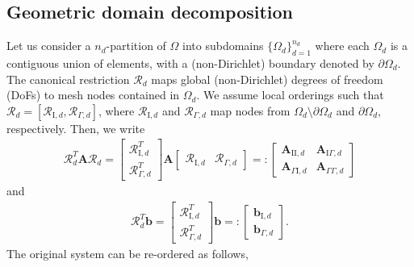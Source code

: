 \documentclass{article}
\begin{document}
\subsection{Geometric domain decomposition}
Let us consider a $n_d$-partition of $\Omega$ into subdomains $\{\Omega_d\}_{d=1}^{n_d}$ where each $\Omega_d$ is a contiguous union of elements, with a (non-Dirichlet) boundary denoted by $\partial\Omega_d$.
The canonical restriction $\boldsymbol{\mathcal{R}}_d$ maps global (non-Dirichlet) degrees of freedom (DoFs) to mesh nodes contained in $\Omega_d$.
We assume local orderings such that $\boldsymbol{\mathcal{R}}_d=[\boldsymbol{\mathcal{R}}_{\mathrm{I},d},\boldsymbol{\mathcal{R}}_{\Gamma,d}]$,
where $\boldsymbol{\mathcal{R}}_{\mathrm{I},d}$ and $\boldsymbol{\mathcal{R}}_{\Gamma,d}$ map nodes from $\Omega_d\setminus\partial\Omega_d$ and $\partial\Omega_d$, respectively.
Then, we write
\begin{align}
\boldsymbol{\mathcal{R}}_d^T\mathbf{A}\boldsymbol{\mathcal{R}}_d=
\begin{bmatrix}\boldsymbol{\mathcal{R}}_{\mathrm{I},d}^T\\\boldsymbol{\mathcal{R}}_{\Gamma,d}^T\end{bmatrix}
\mathbf{A}
\begin{bmatrix}\boldsymbol{\mathcal{R}}_{\mathrm{I},d}&\boldsymbol{\mathcal{R}}_{\Gamma,d}\end{bmatrix}=:
\begin{bmatrix}
\mathbf{A}_{\mathrm{II},d}&\mathbf{A}_{\mathrm{I}\Gamma,d}\\
\mathbf{A}_{\Gamma \mathrm{I},d}&\mathbf{A}_{\Gamma\Gamma,d}
\end{bmatrix}
\end{align}
and
\begin{align}
\boldsymbol{\mathcal{R}}_d^T\mathbf{b}=
\begin{bmatrix}\boldsymbol{\mathcal{R}}_{\mathrm{I},d}^T\\\boldsymbol{\mathcal{R}}_{\Gamma,d}^T\end{bmatrix}\mathbf{b}=:
\begin{bmatrix}\mathbf{b}_{\mathrm{I},d}\\\mathbf{b}_{\Gamma,d}\end{bmatrix}.
\end{align}
The original system can be re-ordered as follows,
\end{document}
